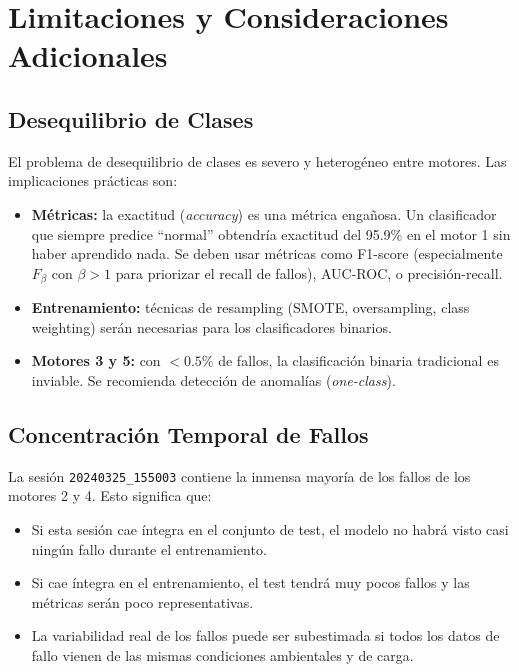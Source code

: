 \documentclass[12pt,a4paper]{article}
\begin{document}
\section{Limitaciones y Consideraciones Adicionales}

\subsection{Desequilibrio de Clases}

El problema de desequilibrio de clases es severo y heterogéneo entre motores.
Las implicaciones prácticas son:

\begin{itemize}[leftmargin=2em]
  \item \textbf{Métricas:} la exactitud (\textit{accuracy}) es una métrica engañosa.
    Un clasificador que siempre predice ``normal'' obtendría exactitud del 95.9\% en
    el motor 1 sin haber aprendido nada. Se deben usar métricas como F1-score
    (especialmente $F_\beta$ con $\beta > 1$ para priorizar el recall de fallos),
    AUC-ROC, o precisión-recall.

  \item \textbf{Entrenamiento:} técnicas de resampling (SMOTE, oversampling,
    class weighting) serán necesarias para los clasificadores binarios.

  \item \textbf{Motores 3 y 5:} con $< 0.5\%$ de fallos, la clasificación binaria
    tradicional es inviable. Se recomienda detección de anomalías (\textit{one-class}).
\end{itemize}

\subsection{Concentración Temporal de Fallos}

La sesión \texttt{20240325\_155003} contiene la inmensa mayoría de los fallos
de los motores 2 y 4. Esto significa que:

\begin{itemize}[leftmargin=2em]
  \item Si esta sesión cae íntegra en el conjunto de test, el modelo no habrá
    visto casi ningún fallo durante el entrenamiento.
  \item Si cae íntegra en el entrenamiento, el test tendrá muy pocos fallos y
    las métricas serán poco representativas.
  \item La variabilidad real de los fallos puede ser subestimada si todos los
    datos de fallo vienen de las mismas condiciones ambientales y de carga.
\end{itemize}
\end{document}
